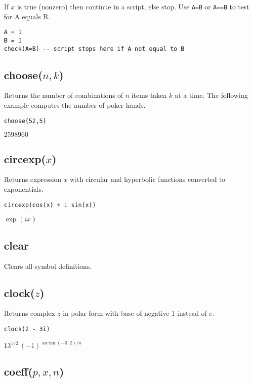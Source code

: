 If $x$ is true (nonzero) then continue in a script, else stop.
Use {\tt A=B} or {\tt A==B} to test for A equals B.

{\color{blue}
\begin{verbatim}
A = 1
B = 1
check(A=B) -- script stops here if A not equal to B
\end{verbatim}
}

\subsection*{choose($n,k$)}

Returns the number of combinations of $n$ items taken $k$ at a time.
The following example computes the number of poker hands.

{\color{blue}
\begin{verbatim}
choose(52,5)
\end{verbatim}
}

\noindent
$2598960$

\subsection*{circexp($x$)}

Returns expression $x$ with circular and hyperbolic functions
converted to exponentials.

{\color{blue}
\begin{verbatim}
circexp(cos(x) + i sin(x))
\end{verbatim}
}

\noindent
$\exp(ix)$

\subsection*{clear}

Clears all symbol definitions.

\subsection*{clock($z$)}

Returns complex $z$ in polar form with base of negative 1 instead of $e$.

{\color{blue}
\begin{verbatim}
clock(2 - 3i)
\end{verbatim}
}

\noindent
$13^{1/2}\,(-1)^{\arctan(-3,2)/\pi}$

\subsection*{coeff($p,x,n$)}


